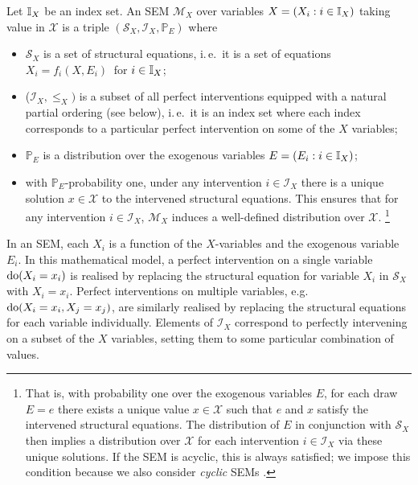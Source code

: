 \begin{definition}
    Let $\mathbb{I}_X$ be an index set.
    An SEM $\mathcal{M}_X$ over  variables ${X = (X_i : i\in\mathbb{I}_X )}$ taking value in $\mathcal{X}$ is a triple $\left(\mathcal{S}_X, \mathcal{I}_X, \mathbb{P}_{E} \right)$ where
    \vspace{-.5em}
    \begin{itemize}[noitemsep]
        \item $\mathcal{S}_X$ is a set of structural equations, i.\,e.\ it is a set of equations $X_i = f_i\left( X , E_i \right)\ $ for $i \in \mathbb{I}_X$;
        \item ($\mathcal{I}_X, \leq_X)$ is a subset of all perfect interventions equipped with a natural partial ordering (see below), i.\,e.\ it is an index set where each index corresponds to a particular perfect intervention on some of the $X$ variables;
        \item $\mathbb{P}_{E}$ is a distribution over the exogenous variables $E = ( E_i : i\in\mathbb{I}_X)$;
        \item with $\mathbb{P}_E$-probability one, under any intervention ${i \in \mathcal{I}_X}$ there is a unique solution $x\in\mathcal{X}$ to the intervened structural equations. This ensures that for any intervention ${i \in \mathcal{I}_X}$, $\mathcal{M}_X$ induces a well-defined distribution over $\mathcal{X}$.%
\footnote{That is, with probability one over the exogenous variables $E$, for each draw $E=e$ there exists a unique value $x\in \mathcal{X}$ such that $e$ and $x$ satisfy the intervened structural equations. The distribution of $E$ in conjunction with $\mathcal{S}_X$ then implies a distribution over $\mathcal{X}$ for each intervention $i \in \mathcal{I}_X$ via these unique solutions.
If the SEM is acyclic, this is always satisfied; we impose this condition because we also consider \emph{cyclic} SEMs \cite{bongers2016structural}.}
    \end{itemize}
    \vspace{-.5em}
\end{definition}

In an SEM, each $X_i$ is a function of the $X$-variables and the exogenous variable $E_i$.
In this mathematical model, a perfect intervention on a single variable $\operatorname{do}(X_i=x_i)$ is realised by replacing the structural equation for variable $X_i$ in $\mathcal{S}_X$ with $X_i = x_i$.
Perfect interventions on multiple variables, e.g. $\operatorname{do}(X_i=x_i, X_j=x_j)$, are similarly realised by replacing the structural equations for each variable individually.
Elements of $\mathcal{I}_X$ correspond to perfectly intervening on a subset of the $X$ variables, setting them to some particular combination of values.

